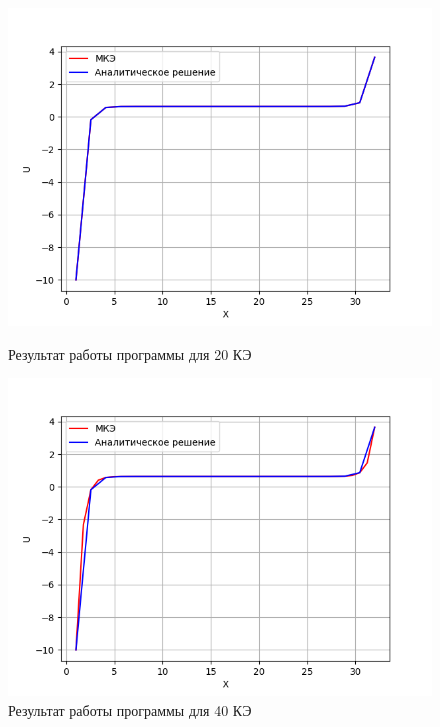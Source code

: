 \begin{figure}[!h]
    \centering
    \begin{minipage}{0.5\textwidth}
        \centering
        \includegraphics[width=1\textwidth]{labs/img/cub/20.png} %
        \caption{Результат работы программы для 20 КЭ}
        \label{c_20}
    \end{minipage}\hfill
    \begin{minipage}{0.5\textwidth}
        \centering
        \includegraphics[width=1\textwidth]{labs/img/cub/40.png} %
        \caption{Результат работы программы для 40 КЭ}
        \label{c_40}
    \end{minipage}
\end{figure}

